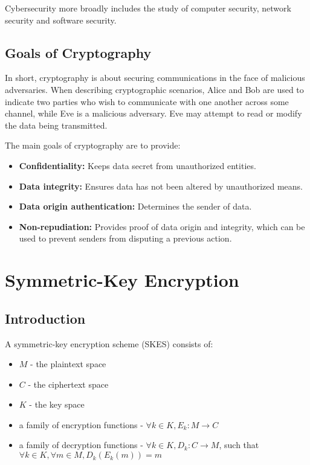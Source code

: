 \documentclass[12pt,titlepage]{article}
\let\stdsection\section
\renewcommand\section{\clearpage\stdsection}
\begin{document}
    Cybersecurity more broadly includes the study of computer security, network security and software
    security.

    \subsection{Goals of Cryptography}
      In short, cryptography is about securing communications in the face of malicious adversaries.
      When describing cryptographic scenarios, Alice and Bob are used to indicate two parties who wish
      to communicate with one another across some channel, while Eve is a malicious adversary. Eve may
      attempt to read or modify the data being transmitted.

      The main goals of cryptography are to provide:
      \begin{itemize}
        \item \textbf{Confidentiality:} Keeps data secret from unauthorized entities.
        \item \textbf{Data integrity:} Ensures data has not been altered by unauthorized means.
        \item \textbf{Data origin authentication:} Determines the sender of data.
        \item \textbf{Non-repudiation:} Provides proof of data origin and integrity, which can be
          used to prevent senders from disputing a previous action.
      \end{itemize}

  \section{Symmetric-Key Encryption}

    \subsection{Introduction}
      A symmetric-key encryption scheme (SKES) consists of:
      \begin{itemize}
        \item $M$ - the plaintext space
        \item $C$ - the ciphertext space
        \item $K$ - the key space
        \item a family of encryption functions - $\forall k \in K, E_k : M \rightarrow C$
        \item a family of decryption functions - $\forall k \in K, D_k : C \rightarrow M$, such that
          $\forall k \in K, \forall m \in M, D_k(E_k(m)) = m$
      \end{itemize}
\end{document}
